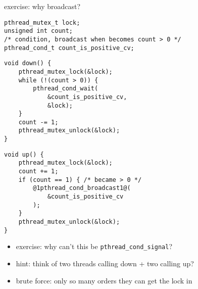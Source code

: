 \begin{frame}[fragile,label=semaphoreMonitorBCastEx]{exercise: why broadcast?}
\begin{lstlisting}
pthread_mutex_t lock;
unsigned int count;
/* condition, broadcast when becomes count > 0 */
pthread_cond_t count_is_positive_cv;
\end{lstlisting}
\begin{minipage}{0.45\textwidth}
\begin{lstlisting}
void down() {
    pthread_mutex_lock(&lock);
    while (!(count > 0)) {
        pthread_cond_wait(
            &count_is_positive_cv,
            &lock);
    }
    count -= 1;
    pthread_mutex_unlock(&lock);
}
\end{lstlisting}
\end{minipage}
\begin{minipage}{0.45\textwidth}
\begin{lstlisting}
void up() {
    pthread_mutex_lock(&lock);
    count += 1;
    if (count == 1) { /* became > 0 */
        @1pthread_cond_broadcast1@(
            &count_is_positive_cv
        );
    }
    pthread_mutex_unlock(&lock);
}
\end{lstlisting}
\end{minipage}
\begin{itemize}
    \item exercise: why can't this be \texttt{pthread\_cond\_signal}?
    \item hint: think of two threads calling down + two calling up?
    \item brute force: only so many orders they can get the lock in
\end{itemize}
\end{frame}

